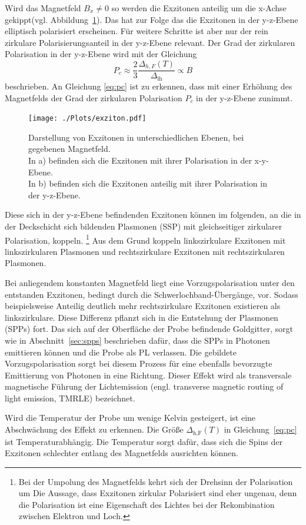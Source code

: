 
Wird das Magnetfeld $B_{x} \neq 0 $ so werden die Exzitonen anteilig um die x-Achse gekippt(vgl. Abbildung~\ref{fig:exziton}).
Das hat zur Folge das die Exzitonen in der y-z-Ebene elliptisch polarisiert erscheinen. 
Für weitere Schritte ist aber nur der rein zirkulare Polarisierungsanteil in der y-z-Ebene relevant.
Der Grad der zirkularen Polarisation in der y-z-Ebene wird mit der Gleichung
\begin{equation}
    P_c \approx \frac{2}{3} \frac{\Delta_{h,F}(T)}{\Delta_\text{lh}} \propto B
    \label{eq:pc}
\end{equation}  %
beschrieben.
An Gleichung \ref{eq:pc} ist zu erkennen, dass mit einer Erhöhung des Magnetfelds der Grad der zirkularen Polarisation $P_{c}$
in der y-z-Ebene zunimmt.
\begin{figure}
    \centering
    \texttt{[image: ./Plots/exziton.pdf]}
    \caption{Darstellung von Exzitonen in unterschiedlichen Ebenen, bei gegebenen Magnetfeld.\\
    In a) befinden sich die Exzitonen mit ihrer Polarisation in der x-y-Ebene.\\
    In b) befinden sich die Exzitonen anteilig mit ihrer Polarisation in der y-z-Ebene.\cite{lars}}
    \label{fig:exziton}
\end{figure}
\FloatBarrier

Diese sich in der y-z-Ebene befindenden Exzitonen können im folgenden, an die in der Deckschicht sich bildenden 
Plasmonen (SSP) mit gleichseitiger zirkularer Polarisation, koppeln.
\footnote{Bei der Umpolung des Magnetfelds kehrt sich der Drehsinn der Polarisation um  
Die Aussage, dass Exzitonen zirkular Polarisiert sind eher ungenau, denn die Polarisation
ist eine Eigenschaft des Lichtes bei der Rekombination zwischen Elektron und Loch.}
Aus dem Grund koppeln linkszirkulare Exzitonen mit linkszirkularen Plasmonen und 
rechtszirkulare Exzitonen mit rechtszirkularen Plasmonen.

Bei anliegendem konstanten Magnetfeld liegt eine Vorzugspolarisation unter 
den entstanden Exzitonen, bedingt durch die Schwerlochband-Übergänge, vor.
Sodass beispielsweise Anteilig deutlich mehr rechtszirkulare Exzitonen existieren
als linkszirkulare. 
Diese Differenz pflanzt sich in die Entstehung der Plasmonen (SPPs) fort.
Das sich auf der Oberfläche der Probe befindende Goldgitter, sorgt wie in Abschnitt~\ref{sec:spps}
beschrieben dafür, dass die SPPs in Photonen emittieren können und die Probe als PL verlassen.
Die gebildete Vorzugspolarisation sorgt bei diesem Prozess für eine ebenfalls bevorzugte Emittierung von Photonen
in eine Richtung. 
Dieser Effekt wird als transversale magnetische Führung der Lichtemission 
(engl. transverse magnetic routing of light emission, TMRLE) bezeichnet.

Wird die Temperatur der Probe um wenige Kelvin gesteigert, ist eine Abschwächung des Effekt zu erkennen.
Die Größe $\Delta_\text{h,F}(T)$ in Gleichung~\ref{eq:pc} ist Temperaturabhängig. 
Die Temperatur sorgt dafür, dass sich die Spins der Exzitonen schlechter entlang
des Magnetfelds ausrichten können.\cite{felix}